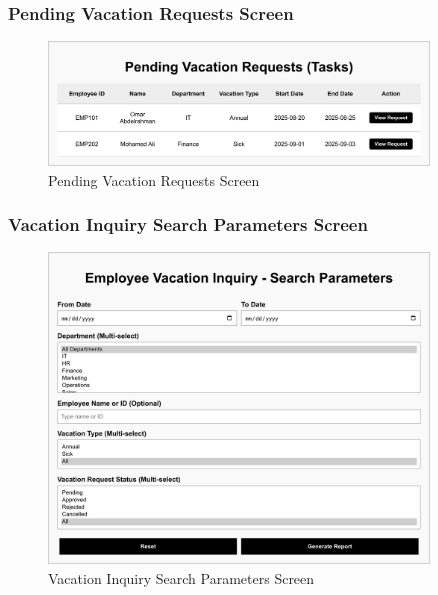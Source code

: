 \documentclass[12pt,a4paper]{article}
\begin{document}
\subsubsection{Pending Vacation Requests Screen}
\begin{figure}[H]
\centering
\includegraphics[width=0.9\textwidth]{Wireframes/Pending-Vacation-Requests/Pending-Vacation-Requests-1.png}
\caption{Pending Vacation Requests Screen}
\label{fig:pending-vacation-requests-screen}
\end{figure}

\subsubsection{Vacation Inquiry Search Parameters Screen}
\begin{figure}[H]
\centering
\includegraphics[width=0.9\textwidth]{Wireframes/Employee-Vacation-Inquiry-Search-Parameters/Employee-Vacation-Inquiry-Search-Parameters-1.png}
\caption{Vacation Inquiry Search Parameters Screen}
\label{fig:inquiry-search-params-screen}
\end{figure}
\end{document}
